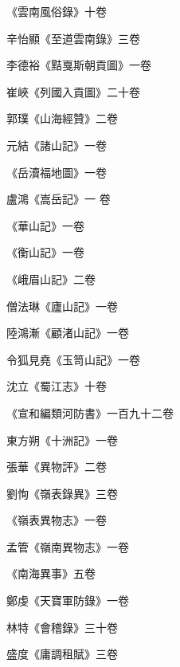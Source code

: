 \begin{pinyinscope}
 《雲南風俗錄》十卷



 辛怡顯《至道雲南錄》三卷



 李德裕《黠戛斯朝貢圖》一卷



 崔峽《列國入貢圖》二十卷



 郭璞《山海經贊》二卷



 元結《諸山記》一卷



 《岳瀆福地圖》一卷



 盧鴻《嵩岳記》一
 卷



 《華山記》一卷



 《衡山記》一卷



 《峨眉山記》二卷



 僧法琳《廬山記》一卷



 陸鴻漸《顧渚山記》一卷



 令狐見堯《玉笥山記》一卷



 沈立《蜀江志》十卷



 《宣和編類河防書》一百九十二卷



 東方朔《十洲記》一卷



 張華《異物評》二卷



 劉恂《嶺表錄異》三卷



 《嶺表異物志》一卷



 孟管《嶺南異物志》一卷



 《南海異事》五卷



 鄭虔《天寶軍防錄》一卷



 林特《會稽錄》三十卷



 盛度《庸調租賦》三卷




\end{pinyinscope}

